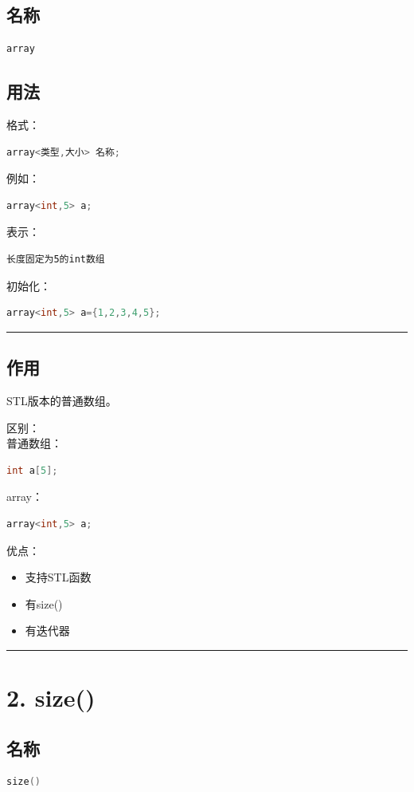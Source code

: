 \documentclass[9pt,twocolumn]{extarticle}
\begin{document}
\subsection{名称}
\begin{lstlisting}[language=C++]
array
\end{lstlisting}

\subsection{用法}
格式：
\begin{lstlisting}[language=C++]
array<类型,大小> 名称;
\end{lstlisting}
例如：
\begin{lstlisting}[language=C++]
array<int,5> a;
\end{lstlisting}
表示：
\begin{lstlisting}
长度固定为5的int数组
\end{lstlisting}
初始化：
\begin{lstlisting}[language=C++]
array<int,5> a={1,2,3,4,5};
\end{lstlisting}

\noindent\rule{\linewidth}{0.4pt}

\subsection{作用}
STL版本的普通数组。

区别：\\
普通数组：
\begin{lstlisting}[language=C++]
int a[5];
\end{lstlisting}
array：
\begin{lstlisting}[language=C++]
array<int,5> a;
\end{lstlisting}
优点：
\begin{itemize}
    \item 支持STL函数
    \item 有size()
    \item 有迭代器
\end{itemize}

\noindent\rule{\linewidth}{0.4pt}

\section{2. size()}

\subsection{名称}
\begin{lstlisting}[language=C++]
size()
\end{lstlisting}
\end{document}
